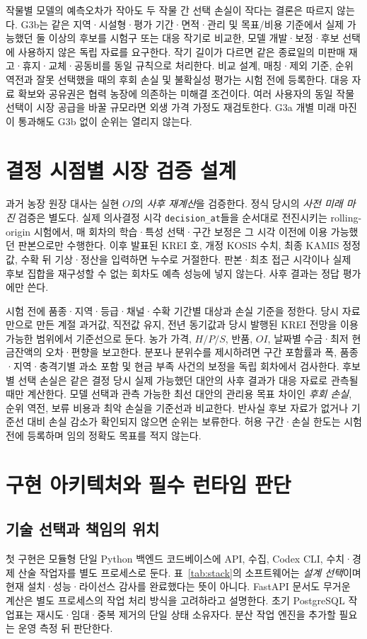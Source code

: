 \documentclass[11pt,a4paper]{article}
\begin{document}
작물별 모델의 예측오차가 작아도 두 작물 간 선택 손실이 작다는 결론은 따르지 않는다. G3b는 같은 지역·시설형·평가 기간·면적·관리 및 목표/비용 기준에서 실제 가능했던 둘 이상의 후보를 시험구 또는 대응 작기로 비교한, 모델 개발·보정·후보 선택에 사용하지 않은 독립 자료를 요구한다. 작기 길이가 다르면 같은 종료일의 미판매 재고·휴지·교체·공동비를 동일 규칙으로 처리한다. 비교 설계, 매칭·제외 기준, 순위 역전과 잘못 선택했을 때의 후회 손실 및 불확실성 평가는 시험 전에 등록한다. 대응 자료 확보와 공유권은 협력 농장에 의존하는 미해결 조건이다. 여러 사용자의 동일 작물 선택이 시장 공급을 바꿀 규모라면 외생 가격 가정도 재검토한다. G3a 개별 미래 마진이 통과해도 G3b 없이 순위는 열리지 않는다.

\section{결정 시점별 시장 검증 설계}
과거 농장 원장 대사는 실현 $OI$의 \emph{사후 재계산}을 검증한다. 정식 당시의 \emph{사전 미래 마진} 검증은 별도다. 실제 의사결정 시각 \texttt{decision\_at}들을 순서대로 전진시키는 rolling-origin 시험에서, 매 회차의 학습·특성 선택·구간 보정은 그 시각 이전에 이용 가능했던 판본으로만 수행한다. 이후 발표된 KREI 호, 개정 KOSIS 수치, 최종 KAMIS 정정값, 수확 뒤 기상·정산을 입력하면 누수로 거절한다. 판본·최초 접근 시각이나 실제 후보 집합을 재구성할 수 없는 회차도 예측 성능에 넣지 않는다. 사후 결과는 정답 평가에만 쓴다.

시험 전에 품종·지역·등급·채널·수확 기간별 대상과 손실 기준을 정한다. 당시 자료만으로 만든 계절 과거값, 직전값 유지, 전년 동기값과 당시 발행된 KREI 전망을 이용 가능한 범위에서 기준선으로 둔다. 농가 가격, $H/P/S$, 반품, $OI$, 날짜별 수금·최저 현금잔액의 오차·편향을 보고한다. 분포나 분위수를 제시하려면 구간 포함률과 폭, 품종·지역·충격기별 과소 포함 및 현금 부족 사건의 보정을 독립 회차에서 검사한다. 후보별 선택 손실은 같은 결정 당시 실제 가능했던 대안의 사후 결과가 대응 자료로 관측될 때만 계산한다. 모델 선택과 관측 가능한 최선 대안의 관리용 목표 차이인 \emph{후회 손실}, 순위 역전, 보류 비용과 최악 손실을 기준선과 비교한다. 반사실 후보 자료가 없거나 기준선 대비 손실 감소가 확인되지 않으면 순위는 보류한다. 허용 구간·손실 한도는 시험 전에 등록하며 임의 정확도 목표를 적지 않는다.

\section{구현 아키텍처와 필수 런타임 판단}
\subsection{기술 선택과 책임의 위치}
첫 구현은 모듈형 단일 Python 백엔드 코드베이스에 API, 수집, Codex CLI, 수치·경제 산술 작업자를 별도 프로세스로 둔다. 표~\ref{tab:stack}의 소프트웨어는 \emph{설계 선택}이며 현재 설치·성능·라이선스 감사를 완료했다는 뜻이 아니다. FastAPI 문서도 무거운 계산은 별도 프로세스의 작업 처리 방식을 고려하라고 설명한다\cite{fastapi-bg}. 초기 PostgreSQL 작업표는 재시도·임대·중복 제거의 단일 상태 소유자다. 분산 작업 엔진을 추가할 필요는 운영 측정 뒤 판단한다.
\end{document}
